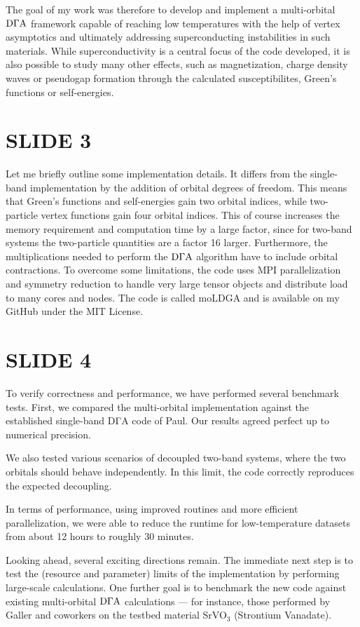 \documentclass[../main.tex]{subfiles}
\begin{document}
The goal of my work was therefore to develop and implement a multi-orbital $\text{D}\Gamma\text{A}$ framework capable of reaching low temperatures with the help of vertex asymptotics and ultimately addressing superconducting instabilities in such materials. While superconductivity is a central focus of the code developed, it is also possible to study many other effects, such as magnetization, charge density waves or pseudogap formation through the calculated susceptibilites, Green's functions or self-energies.

\section*{SLIDE 3}

Let me briefly outline some implementation details. It differs from the single-band implementation by the addition of orbital degrees of freedom. This means that Green's functions and self-energies gain two orbital indices, while two-particle vertex functions gain four orbital indices. This of course increases the memory requirement and computation time by a large factor, since for two-band systems the two-particle quantities are a factor 16 larger. Furthermore, the multiplications needed to perform the $\text{D}\Gamma\text{A}$ algorithm have to include orbital contractions. To overcome some limitations, the code uses MPI parallelization and symmetry reduction to handle very large tensor objects and distribute load to many cores and nodes. The code is called moLDGA and is available on my GitHub under the MIT License.

\section*{SLIDE 4}

To verify correctness and performance, we have performed several benchmark tests. First, we compared the multi-orbital implementation against the established single-band DΓA code of Paul. Our results agreed perfect up to numerical precision.

We also tested various scenarios of decoupled two-band systems, where the two orbitals should behave independently. In this limit, the code correctly reproduces the expected decoupling.

In terms of performance, using improved routines and more efficient parallelization, we were able to reduce the runtime for low-temperature datasets from about 12 hours to roughly 30 minutes.

Looking ahead, several exciting directions remain. The immediate next step is to test the (resource and parameter) limits of the implementation by performing large-scale calculations. One further goal is to benchmark the new code against existing multi-orbital $\text{D}\Gamma\text{A}$ calculations --- for instance, those performed by Galler and coworkers on the testbed material SrVO$_3$ (Strontium Vanadate).
\end{document}

